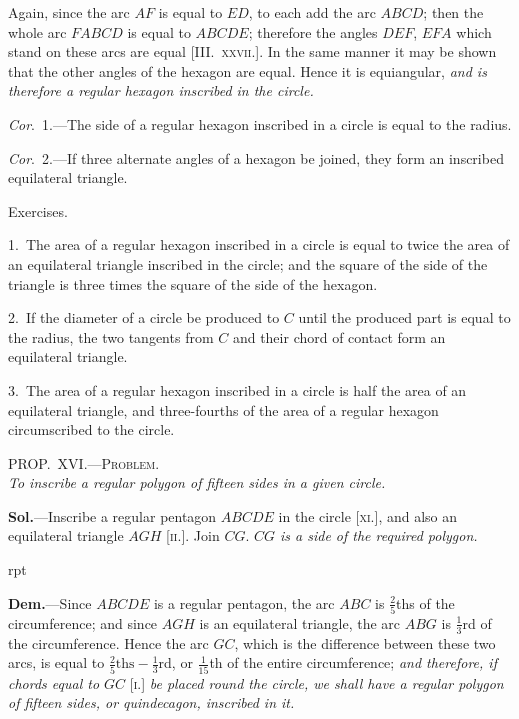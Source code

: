 \documentclass[oneside]{book}
\newcommand\myprop[2]{
\bigskip\Needspace*{4\baselineskip}\begin{center}\textsc{#1}\\\medskip\emph{#2}\par\end{center}
}
\newcommand\exhead[1]{
\Needspace*{5\baselineskip}\begin{center}
\textsf{#1}
\end{center}
}
\newcommand\imgflow[3]{
\setcounter{wrapwidth}{#1}
\begin{wrapfigure}[#2]{r}{\value{wrapwidth}pt}
\begin{center}
\vspace{-0.3in}
\end{center}
\end{wrapfigure}
}
\begin{document}
Again, since the arc $AF$ is equal to $ED$, to each add
the arc $ABCD$; then the whole arc $FABCD$ is equal to
$ABCDE$; therefore the angles $DEF$, $EFA$ which stand
on these arcs are equal [\textsc{III\@.~xxvii.}]. In the same
manner it may be shown that the other angles of the
hexagon are equal. Hence it is equiangular, \emph{and is
therefore a regular hexagon inscribed in the circle.}


\emph{Cor}.~1.---The side of a regular hexagon inscribed in
a circle is equal to the radius.

\emph{Cor}.~2.---If three alternate angles of a hexagon be
joined, they form an inscribed equilateral triangle.

\exhead{Exercises.}

\begin{footnotesize}
1.~The area of a regular hexagon inscribed in a circle is equal to
twice the area of an equilateral triangle inscribed in the circle;
and the square of the side of the triangle is three times the square
of the side of the hexagon.

2.~If the diameter of a circle be produced to $C$ until the produced
part is equal to the radius, the two tangents from $C$ and
their chord of contact form an equilateral triangle.

3.~The area of a regular hexagon inscribed in a circle is half
the area of an equilateral triangle, and three-fourths of the area
of a regular hexagon circumscribed to the circle.
\par\end{footnotesize}

\myprop{PROP\@.~XVI\@.---Problem.}{To inscribe a regular polygon of fifteen sides in a given circle.}

\textbf{Sol.}---Inscribe a regular pentagon $ABCDE$ in the
circle [\textsc{xi.}], and also an equilateral triangle $AGH$ [\textsc{ii.}].
Join $CG$. \emph{$CG$ is a side of the required polygon.}

\imgflow{110}{9}{f168}

\textbf{Dem.}---Since $ABCDE$ is a regular pentagon, the arc
$ABC$ is $\frac{2}{5}$ths of the circumference;
and since $AGH$ is an equilateral
triangle, the arc $ABG$ is $\frac{1}{3}$rd of
the circumference. Hence the arc
$GC$, which is the difference between
these two arcs, is equal to
$\frac{2}{5}\text{ths} - \frac{1}{3}$rd, or $\frac{1}{15}$th of the entire
circumference; \emph{and therefore, if
chords equal to $GC$} [\textsc{i.}] \emph{be placed
round the circle, we shall have a
regular polygon of fifteen sides, or quindecagon, inscribed
in it.}\par\smallskip
\end{document}
